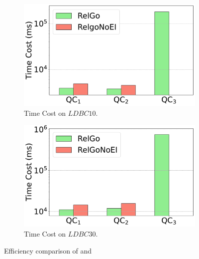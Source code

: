 \begin{figure}[t]
    \vspace{-2em}
    \centering
    \begin{subfigure}[b]{.45\linewidth}
        \centering
        \includegraphics[width=\linewidth]{./figures/exp/ablation_ei_sf10.pdf}
        \vspace{-1.5em}
        \caption{Time Cost on $LDBC10$.}
        \label{fig:exp-expand-intersect-sf10}
    \end{subfigure}
    \begin{subfigure}[b]{0.45\linewidth}
        \centering
        \includegraphics[width=\linewidth]{./figures/exp/ablation_ei_sf30.pdf}
        \vspace{-1.5em}
        \caption{Time Cost on $LDBC30$.}
        \label{fig:exp-expand-intersect-sf30}
    \end{subfigure}
    \caption{Efficiency comparison of \name and \relgomj}
    \label{fig:exp-expand-intersect}
\end{figure}


